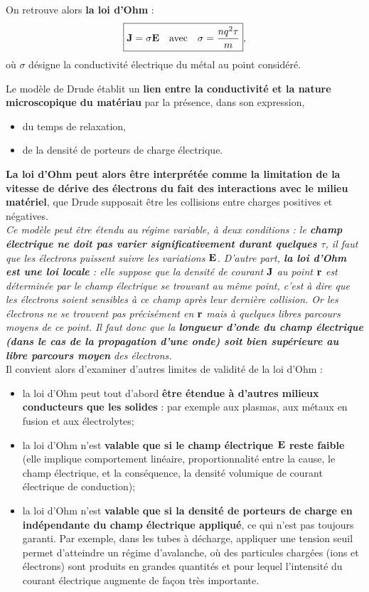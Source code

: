 \documentclass[11pt,a4paper]{report}
\begin{document}
On retrouve alors \textbf{la loi d'Ohm} :
\begin{equation}
	\boxed{\bold{J} = \sigma \bold{E} \quad\text{avec}\quad \sigma = \frac{n q^2\tau}{m}},
\end{equation}
où $\sigma$ désigne la conductivité électrique du métal au point considéré. 

Le modèle de Drude établit un \textbf{lien entre la conductivité et la nature microscopique du matériau} par la présence, dans son expression,
\begin{itemize}
	\item du temps de relaxation,
	\item de la densité de porteurs de charge électrique.
\end{itemize}
\textbf{La loi d'Ohm peut alors être interprétée comme la limitation de la vitesse de dérive des électrons du fait des interactions avec le milieu matériel}, que Drude supposait être les collisions entre charges positives et négatives.\\

\textit{Ce modèle peut être étendu au régime variable, à deux conditions : le \textbf{champ électrique ne doit pas varier significativement durant quelques $\tau$}, il faut que les électrons puissent suivre les variations $\bold{E}$. D'autre part, \textbf{la loi d'Ohm est une loi locale} : elle suppose que la densité de courant $\bold{J}$ au point $\bold{r}$ est déterminée par le champ électrique se trouvant au même point, c'est à dire que les électrons soient sensibles à ce champ après leur dernière collision. Or les électrons ne se trouvent pas précisément en $\bold{r}$ mais à quelques libres parcours moyens de ce point. Il faut donc que la \textbf{longueur d'onde du champ électrique (dans le cas de la propagation d'une onde) soit bien supérieure au libre parcours moyen} des électrons.}\\

Il convient alors d'examiner d'autres limites de validité de la loi d'Ohm :
\begin{itemize}
	\item la loi d'Ohm peut tout d'abord \textbf{être étendue à d'autres milieux conducteurs que les solides} : par exemple aux plasmas, aux métaux en fusion et aux électrolytes;
	\item la loi d'Ohm n'est \textbf{valable que si le champ électrique $\bold{E}$ reste faible} (elle implique comportement linéaire, proportionnalité entre la cause, le champ électrique, et la conséquence, la densité volumique de courant électrique de conduction);
	\item la loi d'Ohm n'est \textbf{valable que si la densité de porteurs de charge en indépendante du champ électrique appliqué}, ce qui n'est pas toujours garanti. Par exemple, dans les tubes à décharge, appliquer une tension seuil permet d'atteindre un régime d'avalanche, où des particules chargées (ions et électrons) sont produits en grandes quantités et pour lequel l'intensité du courant électrique augmente de façon très importante.
\end{itemize}
\end{document}
